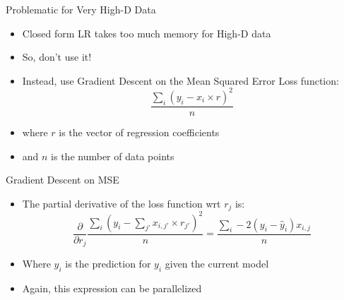 \documentclass[aspectratio=169]{beamer}
\begin{document}
\begin{frame}{Problematic for Very High-D Data}

\begin{itemize}
	\item Closed form LR takes too much memory for High-D data
	\item So, don't use it!
	\item Instead, use Gradient Descent on the Mean Squared Error Loss function:
	$$\frac{\sum_i(y_i - x_i \times r)^2}{n}$$
	\item where $r$ is the vector of regression coefficients
	\item and $n$ is the number of data points
\end{itemize}
\end{frame}
\begin{frame}{Gradient Descent on MSE}

\begin{itemize}
	\item The partial derivative of the loss function wrt $r_j$ is:
	$$\frac{\partial}{\partial r_j}\frac{ \sum_i (y_i - \sum_{j'} x_{i,j'} \times r_{j'})^2}{n} = \frac{\sum_i -2(y_i - \hat{y}_i) x_{i,j}}{n}$$
	\item Where $\hat{y}_i$ is the prediction for $y_i$ given the current model
	\item Again, this expression can be parallelized 
\end{itemize}

\end{frame}
\end{document}
